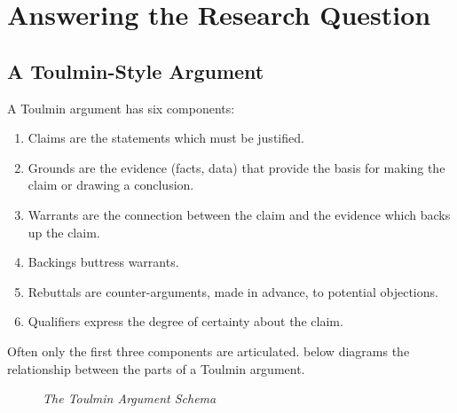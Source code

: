 \section{Answering the Research Question}\label{sec:answ-rese-quest}\indent
\subsection{A Toulmin-Style Argument}\label{sec:toulmin-arguments}%
\indent

A Toulmin argument has six components:
\begin{enumerate}
  \item Claims are the statements which must be justified.
  \item Grounds are the evidence (facts, data) that provide the basis for making the claim or drawing a conclusion.
  \item Warrants are the connection between the claim and the evidence which backs up the claim.
  \item Backings buttress warrants.
  \item Rebuttals are counter-arguments, made in advance, to potential objections.
  \item Qualifiers express the degree of certainty about the claim.
\end{enumerate}
Often only the first three components are articulated.  below diagrams the relationship between the parts of a Toulmin argument.

\begin{figure}[ht]
  \caption{\textit{The Toulmin Argument Schema}}\label{fig:toulmin-arg}%
  \centering%
\end{figure}

